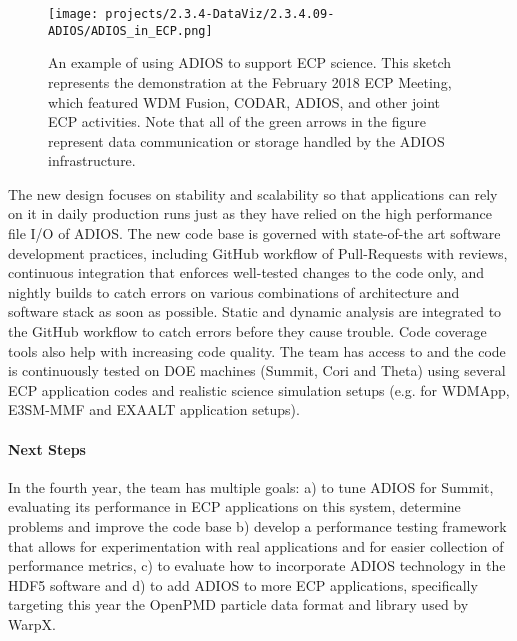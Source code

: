 \begin{figure*}[!th]
	\begin{center}
		\texttt{[image: projects/2.3.4-DataViz/2.3.4.09-ADIOS/ADIOS\_in\_ECP.png]}
		\caption{An example of using ADIOS to support ECP science.  This sketch represents the demonstration at the February 2018 ECP Meeting, which featured WDM Fusion, CODAR, ADIOS, and other joint ECP activities.  Note that all of the green arrows in the figure represent data communication or storage handled by the ADIOS infrastructure.}
		\label{fig:adios-example}
	\end{center}
\end{figure*}

The new design focuses on stability and scalability so that applications can rely on it in daily production runs just as they have relied on the high performance file I/O of ADIOS. The new code base is governed with state-of-the art software development practices, including GitHub workflow of Pull-Requests with reviews, continuous integration that enforces well-tested changes to the code only, and nightly builds to catch errors on various combinations of architecture and software stack as soon as possible. Static and dynamic analysis are integrated to the GitHub workflow to catch errors before they cause trouble. Code coverage tools also help with increasing code quality. The team has access to and the code is continuously tested on DOE machines (Summit, Cori and Theta) using several ECP application codes and realistic science simulation setups (e.g. for WDMApp, E3SM-MMF and EXAALT application setups). 


\paragraph{Next Steps}
In the fourth year, the team has multiple goals: a) to tune ADIOS for Summit, evaluating its performance in ECP applications on this system, determine problems and improve the code base b) develop a performance testing framework that allows for experimentation with real applications and for easier collection of performance metrics,  c) to evaluate how to incorporate ADIOS technology in the HDF5 software and d) to add ADIOS to more ECP applications, specifically targeting this year the OpenPMD particle data format and library used by WarpX. 
